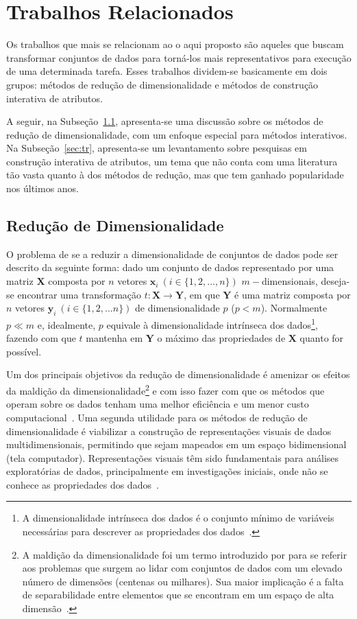 \section{Trabalhos Relacionados}\label{sec:related}

Os trabalhos que mais se relacionam ao o aqui proposto são
aqueles que buscam transformar conjuntos de dados para
torná-los mais representativos para execução de uma
determinada tarefa.  Esses trabalhos dividem-se basicamente
em dois grupos: métodos de redução de dimensionalidade e
métodos de construção interativa de atributos. 

A seguir, na Subseção~\ref{sec:rd}, apresenta-se uma
discussão sobre os métodos de redução de dimensionalidade,
com um enfoque especial para métodos interativos. Na
Subseção~\ref{sec:tr}, apresenta-se um levantamento sobre
pesquisas em construção interativa de atributos, um tema que
não conta com uma literatura tão vasta quanto à dos métodos
de redução, mas que tem ganhado popularidade nos últimos
anos. 

\subsection{Redução de Dimensionalidade}\label{sec:rd}

O problema de se a reduzir a dimensionalidade de conjuntos
de dados pode ser descrito da seguinte forma: dado um
conjunto de dados representado por uma matriz $\textbf{X}$
composta por $n$ vetores $\textbf{x}_i~(i \in
\{1,2,...,n\})$ $m-$dimensionais, deseja-se encontrar uma
transformação $t: \textbf{X} \rightarrow \textbf{Y}$, em que
$\textbf{Y}$ é uma matriz composta por $n$ vetores
$\textbf{y}_i~(i \in \{1,2,...n\})$ de dimensionalidade $p$
($p < m$).  Normalmente $p \ll m$ e, idealmente, $p$
equivale à dimensionalidade intrínseca dos dados\footnote{A
dimensionalidade intrínseca dos dados é o conjunto
mínimo de variáveis necessárias para descrever as
propriedades dos dados~\cite{Fukunaga1990}.}, fazendo
com que $t$ mantenha em $\textbf{Y}$ o máximo das
propriedades de $\textbf{X}$ quanto for possível. 

Um dos principais objetivos da redução de dimensionalidade é
amenizar os efeitos da maldição da
dimensionalidade\footnote{A maldição da dimensionalidade foi
    um termo introduzido por \citet{Bellman1961} para se
    referir aos problemas que surgem ao lidar com conjuntos
    de dados com um elevado número de dimensões (centenas ou
    milhares). Sua maior implicação é a falta de
separabilidade entre elementos que se encontram em um espaço
de alta dimensão~\cite{Kouiroukidis2011}.} e com isso fazer
com que os métodos que operam sobre os dados tenham uma
melhor eficiência e um menor custo
computacional~\cite{Maaten2009}.  
Uma segunda utilidade para os métodos de redução de
dimensionalidade é viabilizar a construção de representações
visuais de dados multidimensionais, permitindo que sejam
mapeados em um espaço bidimensional (tela computador).
Representações visuais têm sido fundamentais para análises
exploratórias de dados, principalmente em investigações
iniciais, onde não
se conhece as propriedades dos dados~\cite{Kaski2011}. 

